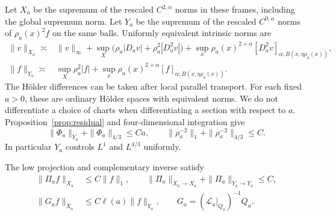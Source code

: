 Let \(X_a\) be the supremum of the rescaled \(C^{2,\alpha}\)
norms in these frames, including the global supremum norm.
Let \(Y_a\) be the supremum of the rescaled \(C^{0,\alpha}\)
norms of \(\rho_a(x)^2f\) on the same balls. Uniformly equivalent
intrinsic norms are
\begin{align}
 \|v\|_{X_a}\asymp{}&
 \|v\|_\infty+\sup_X\bigl(\rho_a|D_av|+
                            \rho_a^2|D_a^2v|\bigr)
 +\sup_x\rho_a(x)^{2+\alpha}
       [D_a^2v]_{\alpha;B(x,\eta\rho_a(x))},
                                                \label{eq:scaled-x}\\
 \|f\|_{Y_a}\asymp{}&
 \sup_X\rho_a^2|f|
 +\sup_x\rho_a(x)^{2+\alpha}
       [f]_{\alpha;B(x,\eta\rho_a(x))}.
                                                \label{eq:scaled-y}
\end{align}
The Hölder differences can be taken after local parallel transport.
For each fixed \(a>0\), these are ordinary Hölder spaces with
equivalent norms. We do not differentiate a choice of charts
when differentiating a section with respect to \(a\).
Proposition~\ref{prop:residual} and four-dimensional integration give
\begin{equation}\label{eq:source-norms}
 \|\Phi_a\|_{Y_a}+\|\Phi_a\|_{4/3}\le Ca,\qquad
 \|\rho_a^{-2}\|_1+\|\rho_a^{-2}\|_{4/3}\le C.
\end{equation}
In particular \(Y_a\) controls \(L^1\) and \(L^{4/3}\) uniformly.

\begin{lemma}\label{lem:weighted-inverse}
The low projection and complementary inverse satisfy
\begin{align}
 \|\Pi_af\|_{X_a}&\le C\|f\|_1,\qquad
 \|\Pi_a\|_{X_a\to X_a}+\|\Pi_a\|_{Y_a\to Y_a}\le C,
                                                    \label{eq:low-projection}\\
 \|G_af\|_{X_a}&\le C\ell(a)\|f\|_{Y_a},\qquad
 G_a=(\mathcal L_a|_{Q_a})^{-1}Q_a.
                                                    \label{eq:log-inverse}
\end{align}
\end{lemma}

